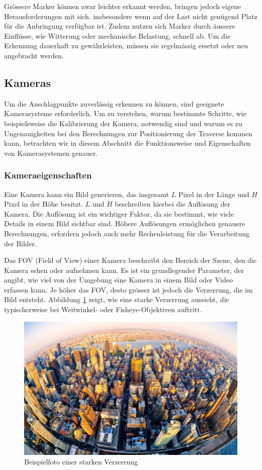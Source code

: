 Grössere Marker können zwar leichter erkannt werden, bringen jedoch eigene Herausforderungen mit sich. 
insbesondere wenn auf der Last nicht genügend Platz für die Anbringung verfügbar ist. Zudem nutzen 
sich Marker durch äussere Einflüsse, wie Witterung oder mechanische Belastung, schnell ab. Um die 
Erkennung dauerhaft zu gewährleisten, müssen sie regelmässig ersetzt oder neu angebracht werden.


\clearpage
\subsection{Kameras}
Um die Anschlagpunkte zuverlässig erkennen zu können, sind geeignete Kamerasysteme
erforderlich. Um zu verstehen, warum bestimmte Schritte, wie beispielsweise die 
Kalibrierung der Kamera, notwendig sind und warum es zu Ungenauigkeiten bei den 
Berechnungen zur Positionierung der Traverse kommen kann, betrachten wir in diesem 
Abschnitt die Funktionsweise und Eigenschaften von Kamerasystemen genauer.

\subsubsection{Kameraeigenschaften}
Eine Kamera kann ein Bild generieren, das insgesamt \( L \) Pixel in 
der Länge und \( H \) Pixel in der Höhe besitzt. \( L \) und \( H \) 
beschreiben hierbei die Auflösung der Kamera. Die Auflösung ist ein 
wichtiger Faktor, da sie bestimmt, wie viele Details in einem Bild 
sichtbar sind. Höhere Auflösungen ermöglichen genauere Berechnungen, 
erfordern jedoch auch mehr Rechenleistung für die Verarbeitung der 
Bilder.

Das FOV (Field of View) einer Kamera beschreibt den Bereich der Szene,
den die Kamera sehen oder aufnehmen kann. Es ist ein grundlegender 
Parameter, der angibt, wie viel von der Umgebung eine Kamera in einem 
Bild oder Video erfassen kann. Je höher das FOV, desto grösser ist 
jedoch die Verzerrung, die im Bild entsteht.
Abbildung \ref{fig:fisheye} zeigt, wie eine starke Verzerrung aussieht,
die typischerweise bei Weitwinkel- oder Fisheye-Objektiven auftritt.

\begin{figure}[H]
    \centering
    \includegraphics[width=0.5\linewidth]{graphics/fisheye.jpg}
    \caption{Beispielfoto einer starken Verzerrung}
    \label{fig:fisheye}
\end{figure}

